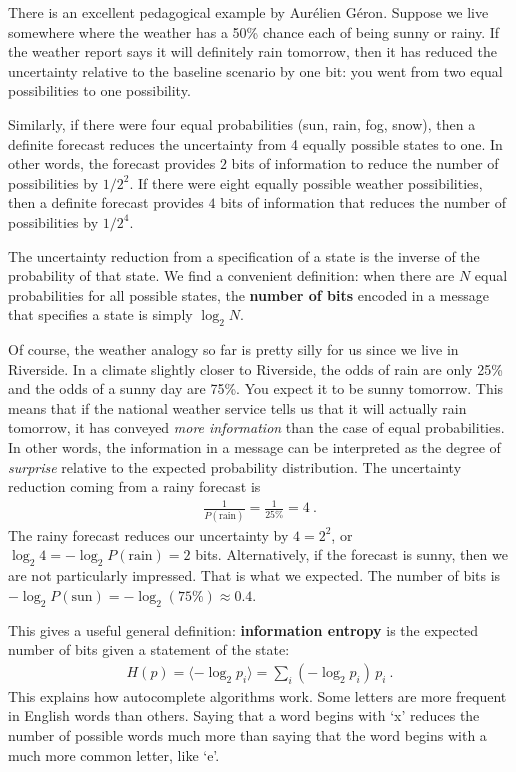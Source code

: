 There is an excellent pedagogical example by Aur\'elien G\'eron. Suppose we live somewhere where the weather has a 50\% chance each of being sunny or rainy. If the weather report says it will definitely rain tomorrow, then it has reduced the uncertainty relative to the baseline scenario by one bit: you went from two equal possibilities to one possibility. 

Similarly, if there were four equal probabilities (sun, rain, fog, snow), then a definite forecast reduces the uncertainty from 4 equally possible states to one. In other words, the forecast provides $2$ bits of information to reduce the number of possibilities by $1/2^2$. If there were eight equally possible weather possibilities, then a definite forecast provides $4$ bits of information that reduces the number of possibilities by $1/2^4$. 

The uncertainty reduction from a specification of a state is the inverse of the probability of that state. We find a convenient definition: when there are $N$ equal probabilities for all possible states, the \textbf{number of bits} encoded in a message that specifies a state is simply $\log_2 N$.

Of course, the weather analogy so far is pretty silly for us since we live in Riverside. In a climate slightly closer to Riverside, the odds of rain are only 25\% and the odds of a sunny day are 75\%. You expect it to be sunny tomorrow. This means that if the national weather service tells us that it will actually rain tomorrow, it has conveyed \emph{more information} than the case of equal probabilities. In other words, the information in a message can be interpreted as the degree of \emph{surprise} relative to the expected probability distribution. The uncertainty reduction coming from a rainy forecast is
\begin{align}
	\frac{1}{P(\text{rain})} = \frac{1}{25\%} = 4 \ .
\end{align}
The rainy forecast reduces our uncertainty by $4=2^2$, or $\log_2 4=-\log_2 P(\text{rain})=2$ bits. Alternatively, if the forecast is sunny, then we are not particularly impressed. That is what we expected. The number of bits is $-\log_2P(\text{sun}) = -\log_2(75\%) \approx 0.4$.

This gives a useful general definition: \textbf{information entropy} is the expected number of bits given a statement of the state:
\begin{align}
	H(p) = \langle -\log_2 p_i \rangle = \sum_i (-\log_2 p_i)\, p_i \ .
\end{align}
This explains how autocomplete algorithms work. Some letters are more frequent in English words than others. Saying that a word begins with `x' reduces the number of possible words much more than saying that the word begins with a much more common letter, like `e'.



